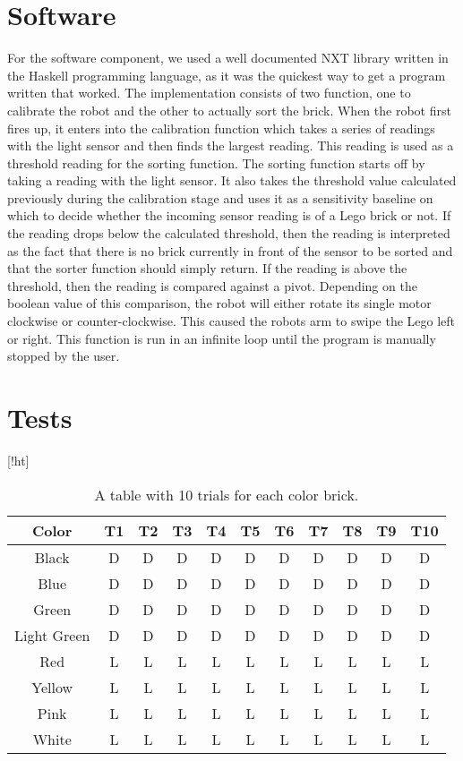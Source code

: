 \documentclass{article}
\begin{document}
\section{Software}
For the software component, we used a well documented NXT library written in the Haskell programming language, as it was the quickest way to get a program written that worked.
The implementation consists of two function, one to calibrate the robot and the other to actually sort the brick.
When the robot first fires up, it enters into the calibration function which takes a series of readings with the light sensor and then finds the largest reading.
This reading is used as a threshold reading for the sorting function.
The sorting function starts off by taking a reading with the light sensor.
It also takes the threshold value calculated previously during the calibration stage and uses it as a sensitivity baseline on which to decide whether the incoming sensor reading is of a Lego brick or not.
If the reading drops below the calculated threshold, then the reading is interpreted as the fact that there is no brick currently in front of the sensor to be sorted and that the sorter function should simply return.
If the reading is above the threshold, then the reading is compared against a pivot.
Depending on the boolean value of this comparison, the robot will either rotate its single motor clockwise or counter-clockwise.
This caused the robots arm to swipe the Lego left or right.
This function is run in an infinite loop until the program is manually stopped by the user.

\section{Tests}[!ht]
\begin{table}
  \begin{center}
    \begin{tabular}{| c | c | c | c | c | c | c | c | c | c | c |}
      \hline 
      Color   & T1 & T2 & T3 & T4 & T5 & T6 & T7 & T8 & T9 & T10 \\
      \hline
      Black   &   D &  D  &  D  &  D  &  D  &  D  &  D  &  D  &  D  &  D   \\
      Blue    & D   &  D  &  D  &  D  &  D  &  D  &  D  &  D  &  D  &  D   \\
      Green   &  D  &  D  &  D  &  D  &  D  &  D  & D   &  D  & D   &  D   \\
 Light Green  &  D  & D   &  D  &  D  &  D  &  D  &  D  &  D  & D   &  D   \\
      Red     &  L  & L   &   L &  L  &  L  &  L  &  L  &  L  & L   &  L   \\
      Yellow  & L   &  L  & L   & L   &  L  & L   & L   &  L  & L   &  L   \\
      Pink    & L   &  L  & L   & L   & L   &  L  &  L  & L   & L   &  L   \\
      White   &  L  &  L  & L   & L   &  L  & L   &  L  &  L  &  L  &  L   \\
      \hline
    \end{tabular}
  \end{center}
  \caption{A table with 10 trials for each color brick.}
\end{table}
\end{document}
